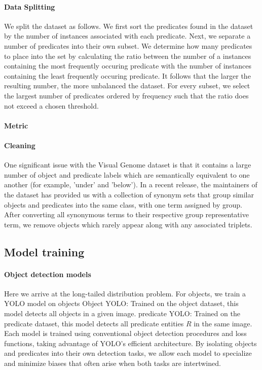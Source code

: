 \documentclass{article}
\begin{document}
\paragraph{Data Splitting}
We split the dataset as follows. We first sort the predicates found in the dataset by the number of instances associated with each predicate. Next, we separate a number of predicates into their own subset. We determine how many predicates to place into the set by calculating the ratio between the number of a instances containing the most frequently occuring predicate with the number of instances containing the least frequently occuring predicate. It follows that the larger the resulting number, the more unbalanced the dataset. For every subset, we select the largest number of predicates ordered by frequency such that the ratio does not exceed a chosen threshold. 

\paragraph{Metric}

\paragraph{Cleaning}
One significant issue with the Visual Genome dataset is that it contains a large number of object and predicate labels which are semantically equivalent to one another (for example, 'under' and 'below'). In a recent release, the maintainers of the dataset has provided us with a collection of synonym sets that group similar objects and predicates into the same class, with one term assigned by group. After converting all synonymous terms to their respective group representative term, we remove objects which rarely appear along with any associated triplets. 



\subsection{Model training}


\paragraph{Object detection models}
Here we arrive at the long-tailed distribution problem. For objects, we train a YOLO model on objects 
Object YOLO: Trained on the object dataset, this model detects all objects in a given image.
predicate YOLO: Trained on the predicate dataset, this model detects all predicate entities $R$ in the same image.
Each model is trained using conventional object detection procedures and loss functions, taking advantage of YOLO’s efficient architecture. By isolating objects and predicates into their own detection tasks, we allow each model to specialize and minimize biases that often arise when both tasks are intertwined.
\end{document}
